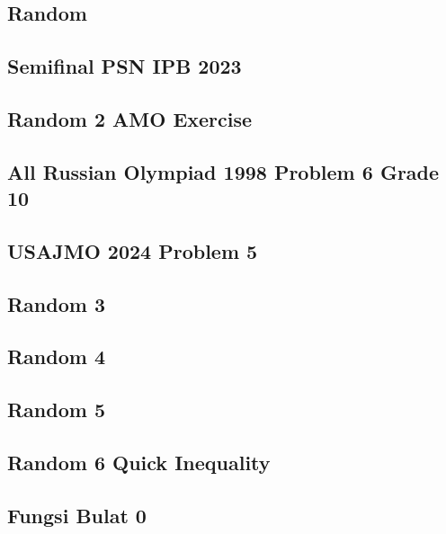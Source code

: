 \subsection{Random}


\subsection{Semifinal PSN IPB 2023}


\subsection{Random 2 AMO Exercise}


\subsection{All Russian Olympiad 1998 Problem 6 Grade 10}


\subsection{USAJMO 2024 Problem 5}


\subsection{Random 3}


\subsection{Random 4}


\subsection{Random 5}


\subsection{Random 6 Quick Inequality}


\subsection{Fungsi Bulat 0}


